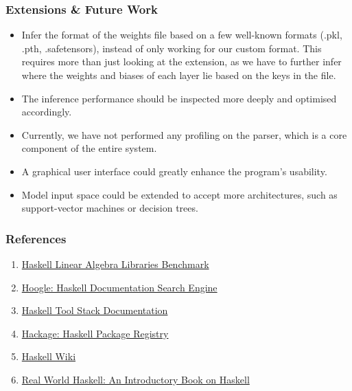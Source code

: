 \documentclass{beamer}
\begin{document}
\begin{frame}
  \frametitle{Extensions \& Future Work}

  \begin{itemize}
    \item Infer the format of the weights file based on a few well-known formats (.pkl, .pth, .safetensors), instead of only working for our custom format. This requires more than just looking at the extension, as we have to further infer where the weights and biases of each layer lie based on the keys in the file. 
    \item<2-> The inference performance should be inspected more deeply and optimised accordingly.
    \item<3-> Currently, we have not performed any profiling on the parser, which is a core component of the entire system.
    \item<4-> A graphical user interface could greatly enhance the program's usability.
    \item<5-> Model input space could be extended to accept more architectures, such as support-vector machines or decision trees.
  \end{itemize}  

\end{frame}

\begin{frame}
  \frametitle{References}

  \begin{enumerate}
    \item \href{https://github.com/Magalame/fastest-matrices}{Haskell Linear Algebra Libraries Benchmark}
    \item \href{https://hoogle.haskell.org/}{Hoogle: Haskell Documentation Search Engine}
    \item \href{https://docs.haskellstack.org/}{Haskell Tool Stack Documentation}
    \item \href{https://hackage.haskell.org/}{Hackage: Haskell Package Registry}
    \item \href{https://wiki.haskell.org/}{Haskell Wiki}
    \item \href{https://book.realworldhaskell.org/}{Real World Haskell: An Introductory Book on Haskell}
  \end{enumerate}    

\end{frame}
\end{document}
